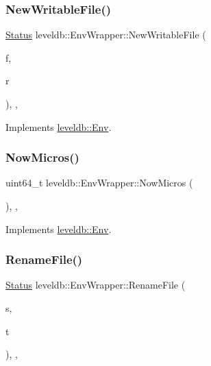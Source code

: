 \subsubsection{\texorpdfstring{NewWritableFile()}{NewWritableFile()}}
{\footnotesize\ttfamily \mbox{\hyperlink{classleveldb_1_1_status}{Status}} leveldb\+::\+Env\+Wrapper\+::\+New\+Writable\+File (\begin{DoxyParamCaption}\item[{const std\+::string \&}]{f,  }\item[{\mbox{\hyperlink{classleveldb_1_1_writable_file}{Writable\+File}} $\ast$$\ast$}]{r }\end{DoxyParamCaption})\hspace{0.3cm}{\ttfamily [inline]}, {\ttfamily [override]}, {\ttfamily [virtual]}}



Implements \mbox{\hyperlink{classleveldb_1_1_env_a4566194f3e82fede425fdb5bb355f7de}{leveldb\+::\+Env}}.

\mbox{\label{classleveldb_1_1_env_wrapper_ad037f3ac120367d5499e0c61e39785a3}} 
\subsubsection{\texorpdfstring{NowMicros()}{NowMicros()}}
{\footnotesize\ttfamily uint64\+\_\+t leveldb\+::\+Env\+Wrapper\+::\+Now\+Micros (\begin{DoxyParamCaption}{ }\end{DoxyParamCaption})\hspace{0.3cm}{\ttfamily [inline]}, {\ttfamily [override]}, {\ttfamily [virtual]}}



Implements \mbox{\hyperlink{classleveldb_1_1_env_a988062bcd558ac02c62522ac2c8aa39f}{leveldb\+::\+Env}}.

\mbox{\label{classleveldb_1_1_env_wrapper_a242f2f6f35bd043ba6905a49704d20c9}} 
\subsubsection{\texorpdfstring{RenameFile()}{RenameFile()}}
{\footnotesize\ttfamily \mbox{\hyperlink{classleveldb_1_1_status}{Status}} leveldb\+::\+Env\+Wrapper\+::\+Rename\+File (\begin{DoxyParamCaption}\item[{const std\+::string \&}]{s,  }\item[{const std\+::string \&}]{t }\end{DoxyParamCaption})\hspace{0.3cm}{\ttfamily [inline]}, {\ttfamily [override]}, {\ttfamily [virtual]}}



